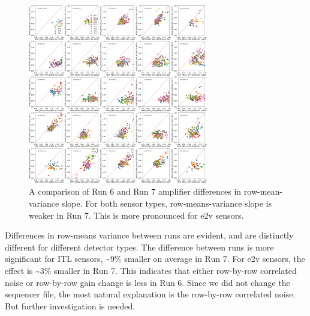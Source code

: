 \begin{figure}[ht]
\begin{centering}
\includegraphics[width=0.7\textwidth]{figures/baselineCharacterization/13550_E1071_ROW_MEAN_VAR_SLOPE.png}
\caption{A comparison of Run 6 and Run 7 amplifier differences in row-mean-variance slope. For both sensor types, row-means-variance slope is weaker in Run 7. This is more pronounced for e2v sensors.}
\end{centering}
\end{figure}

Differences in row-means variance between runs are evident, and are distinctly different for different detector types. The difference between runs is more significant for ITL sensors, \textasciitilde9\% smaller on average in Run 7. For e2v sensors, the effect is \textasciitilde3\% smaller in Run 7. This indicates that either row-by-row correlated noise or row-by-row gain change is less in Run 6. Since we did not change the sequencer file, the most natural explanation is the row-by-row correlated noise. But further investigation is needed.

